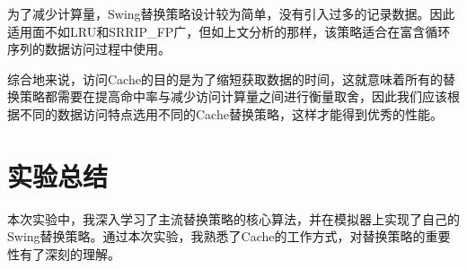 \documentclass{article}
\begin{document}
为了减少计算量，Swing替换策略设计较为简单，没有引入过多的记录数据。因此适用面不如LRU和SRRIP\_FP广，但如上文分析的那样，该策略适合在富含循环序列的数据访问过程中使用。

综合地来说，访问Cache的目的是为了缩短获取数据的时间，这就意味着所有的替换策略都需要在提高命中率与减少访问计算量之间进行衡量取舍，因此我们应该根据不同的数据访问特点选用不同的Cache替换策略，这样才能得到优秀的性能。


\section{实验总结}
本次实验中，我深入学习了主流替换策略的核心算法，并在模拟器上实现了自己的Swing替换策略。通过本次实验，我熟悉了Cache的工作方式，对替换策略的重要性有了深刻的理解。
\end{document}
